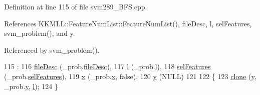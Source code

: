 Definition at line 115 of file svm289\+\_\+\+B\+F\+S.\+cpp.



References K\+K\+M\+L\+L\+::\+Feature\+Num\+List\+::\+Feature\+Num\+List(), file\+Desc, l, sel\+Features, svm\+\_\+problem(), and y.



Referenced by svm\+\_\+problem().


\begin{DoxyCode}
115                                                             :
116       \hyperlink{struct_s_v_m289___b_f_s_1_1svm__problem_a4a6fa480764f4482b0edeeabe7087909}{fileDesc}     (\_prob.\hyperlink{struct_s_v_m289___b_f_s_1_1svm__problem_a4a6fa480764f4482b0edeeabe7087909}{fileDesc}),
117       \hyperlink{struct_s_v_m289___b_f_s_1_1svm__problem_afd75fe2ff65aa0c0f27b85b04028b2f3}{l}            (\_prob.\hyperlink{struct_s_v_m289___b_f_s_1_1svm__problem_afd75fe2ff65aa0c0f27b85b04028b2f3}{l}),
118       \hyperlink{struct_s_v_m289___b_f_s_1_1svm__problem_a3de9b51904777989df0afaed3af9b616}{selFeatures}  (\_prob.\hyperlink{struct_s_v_m289___b_f_s_1_1svm__problem_a3de9b51904777989df0afaed3af9b616}{selFeatures}),
119       \hyperlink{struct_s_v_m289___b_f_s_1_1svm__problem_a41858dbcf26913311ad17674d9eb42a8}{x}            (\_prob.\hyperlink{struct_s_v_m289___b_f_s_1_1svm__problem_a41858dbcf26913311ad17674d9eb42a8}{x}, \textcolor{keyword}{false}),
120       \hyperlink{struct_s_v_m289___b_f_s_1_1svm__problem_a6a79c81e0e6251913062a811c87d9325}{y}            (NULL)
121 
122 \{
123   \hyperlink{namespace_s_v_m289___b_f_s_a5030305fb16e512e60b31d312ddda3c6}{clone} (\hyperlink{struct_s_v_m289___b_f_s_1_1svm__problem_a6a79c81e0e6251913062a811c87d9325}{y}, \_prob.\hyperlink{struct_s_v_m289___b_f_s_1_1svm__problem_a6a79c81e0e6251913062a811c87d9325}{y}, \hyperlink{struct_s_v_m289___b_f_s_1_1svm__problem_afd75fe2ff65aa0c0f27b85b04028b2f3}{l});
124 \}
\end{DoxyCode}
